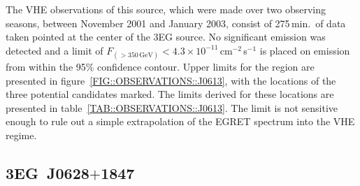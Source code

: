 The VHE observations of this source, which were made over two
observing seasons, between November 2001 and January 2003, consist of
275\,min.\ of data taken pointed at the center of the 3EG source. No
significant emission was detected and a limit of
$F_{(>350\,\mathrm{GeV})}<4.3\times10^{-11}$\,cm$^{-2}$\,s$^{-1}$ is
placed on emission from within the 95\% confidence contour. Upper
limits for the region are presented in
figure~\ref{FIG::OBSERVATIONS::J0613}, with the locations of the three
potential candidates marked. The limits derived for these locations
are presented in table~\ref{TAB::OBSERVATIONS::J0613}. The limit is
not sensitive enough to rule out a simple extrapolation of the EGRET
spectrum into the VHE regime.


\subsection{3EG~J0628$+$1847}

